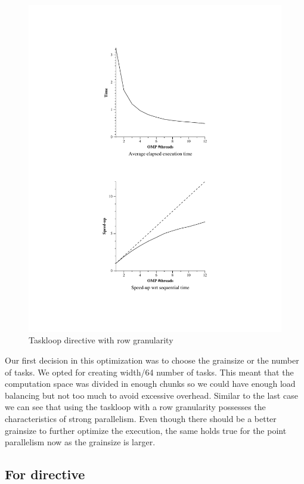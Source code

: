 \documentclass[11pt]{article}
\begin{document}
\begin{figure}[!htb]
\begin{minipage}[t]{0.48\textwidth}
    \centerline{\includegraphics[width=1.5\linewidth]{./Taskloop/point/point.pdf}}
    \caption{Taskloop directive with row granularity}
  \end{minipage}
\end{figure}
\FloatBarrier
Our first decision in this optimization was to choose the grainsize or the number of tasks. We opted for creating width/64 number of tasks. This meant that the computation space was divided in enough chunks so we could have enough load balancing but not too much to avoid excessive overhead. 
Similar to the last case we can see that using the taskloop with a row granularity possesses the characteristics of strong parallelism. Even though there should be a better grainsize to further optimize the execution, the same holds true for the point parallelism now as the grainsize is larger.

\subsection{For directive}
\end{document}
